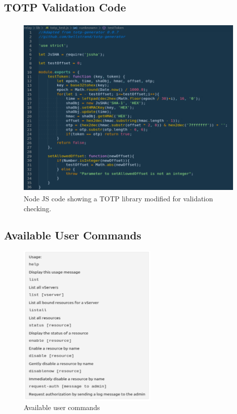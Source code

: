 \documentclass[onecolumn, draftclsnofoot,10pt, compsoc]{IEEEtran}
\begin{document}
\subsection{TOTP Validation Code}
\begin{figure}[h]
    \centering
    \captionsetup{format=hang,justification=raggedright,margin=2cm}
    \includegraphics[height=9cm]{totp.png}
    \caption[TOTP Validation]{Node JS code showing a TOTP library modified for validation checking.}
    \label{fig:TOTP Validation}
\end{figure}

\subsection{Available User Commands}
\begin{figure}[h]
    \centering
    \captionsetup{format=hang,justification=raggedright,margin=2cm}
    \includegraphics[height=8cm]{usercommands.png}
    \caption[User Commands]{Available user commands}
    \label{fig:Commands}
\end{figure}

%
%
\end{document}
